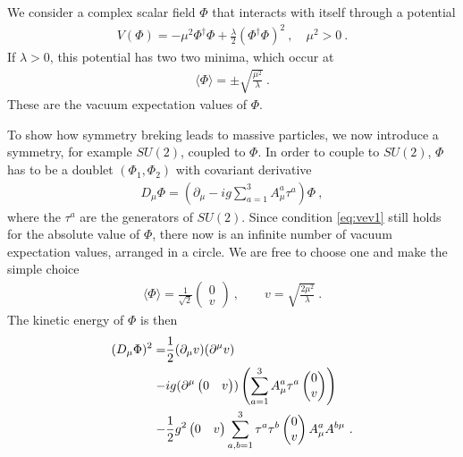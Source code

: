 We consider a complex scalar field $\Phi$ that interacts with itself through a potential
\begin{align}
	V(\Phi) = -\mu^2\Phi^\dagger\Phi + \frac{\lambda}{2}(\Phi^\dagger\Phi)^2 \ , \quad \mu^2 > 0 \ .
\end{align}
If $\lambda>0$, this potential has two two minima, which occur at
\begin{align}\label{eq:vev1}
	\langle\Phi\rangle =  \pm\sqrt{\frac{\mu^2}{\lambda}} \ .
\end{align}
These are the vacuum expectation values of $\Phi$.

To show how symmetry breking leads to massive particles, we now introduce a symmetry, for example $SU(2)$, coupled to $\Phi$. In order to couple to $SU(2)$, $\Phi$ has to be a doublet $(\Phi_1,\Phi_2)$ with covariant derivative
\begin{align}
	D_\mu\Phi = (\partial_\mu - ig\sum_{a=1}^3A_\mu^a\tau^a)\Phi \ ,
\end{align}
where the $\tau^a$ are the generators of $SU(2)$. Since condition \ref{eq:vev1} still holds for the absolute value of $\Phi$, there now is an infinite number of vacuum expectation values, arranged in a circle. We are free to choose one and make the simple choice
\begin{align}\label{eq:vev2}
	\langle\Phi\rangle = \frac{1}{\sqrt{2}}\begin{pmatrix} 0 \\ v \end{pmatrix} \ , \qquad v = \sqrt{\frac{2\mu^2}{\lambda}} \ .
\end{align}
The kinetic energy of $\Phi$ is then
\begin{align}\label{eq:Ekin}
	(D_\mu\Phi)^2 = &\frac{1}{2}(\partial_\mu v)(\partial^\mu v)\notag \\
	- &ig(\partial^\mu\begin{pmatrix} 0 & v \end{pmatrix}) \left(\sum_{a=1}^3A_\mu^a\tau^a\begin{pmatrix} 0 \\ v \end{pmatrix}\right)\notag \\
	- &\frac{1}{2}g^2\begin{pmatrix} 0 & v \end{pmatrix}\sum_{a,b=1}^{3}\tau^a\tau^b\begin{pmatrix} 0 \\ v \end{pmatrix}A_\mu^aA^{b\mu} \ .
\end{align}
